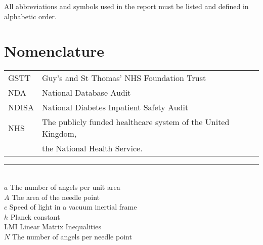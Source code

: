  All abbreviations and symbols used in the report must be listed and defined in alphabetic order.

\section*{Nomenclature}

\begin{flushleft}
\begin{minipage}{1\textwidth}
    	\centering
        \def\arraystretch{1.25}%
    	\begin{tabular}{ll}
                GSTT  & Guy's and St Thomas' NHS Foundation Trust \\
                NDA   & National Database Audit  \\
    		NDISA & National Diabetes Inpatient Safety Audit \\  
    		NHS & The publicly funded healthcare system of the United Kingdom, \\ 
            & the National Health Service. \\
      
                
    	\end{tabular}
\end{minipage}

\end{flushleft}

\noindent\rule{8cm}{0.4pt} \\ %
$a$ \qquad The number of angels per unit area\\
$A$ \qquad The area of the needle point\\
$c$ \qquad Speed of light in a vacuum inertial frame\\
$h$ \qquad Planck constant\\
LMI	\qquad Linear Matrix Inequalities\\
$N$ \qquad The number of angels per needle point